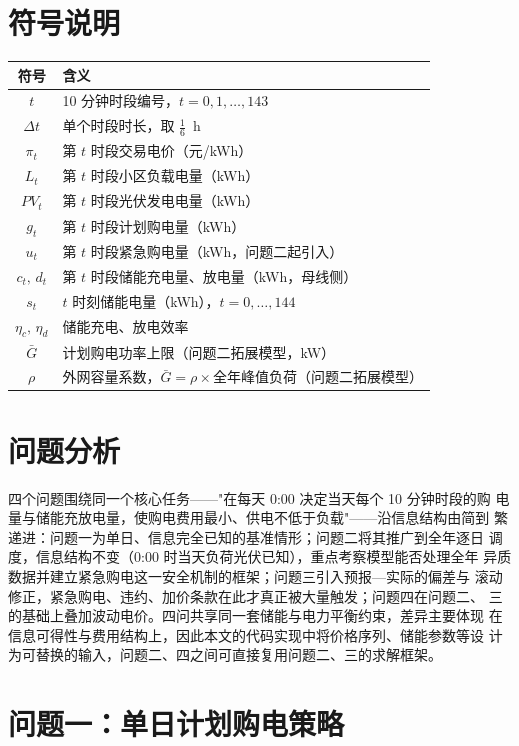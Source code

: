 \documentclass[withoutpreface,bwprint]{cumcmthesis}
\begin{document}
\section{符号说明}
\begin{center}
\begin{tabular}{cl}
\toprule[1.5pt]
符号 & 含义 \\
\midrule[1pt]
$t$ & 10 分钟时段编号，$t=0,1,\dots,143$ \\
$\Delta t$ & 单个时段时长，取 $\frac16$~h \\
$\pi_t$ & 第 $t$ 时段交易电价（元/kWh） \\
$L_t$ & 第 $t$ 时段小区负载电量（kWh） \\
$PV_t$ & 第 $t$ 时段光伏发电电量（kWh） \\
$g_t$ & 第 $t$ 时段计划购电量（kWh） \\
$u_t$ & 第 $t$ 时段紧急购电量（kWh，问题二起引入） \\
$c_t,\,d_t$ & 第 $t$ 时段储能充电量、放电量（kWh，母线侧） \\
$s_t$ & $t$ 时刻储能电量（kWh），$t=0,\dots,144$ \\
$\eta_c,\,\eta_d$ & 储能充电、放电效率 \\
$\bar G$ & 计划购电功率上限（问题二拓展模型，kW） \\
$\rho$ & 外网容量系数，$\bar G=\rho\times$全年峰值负荷（问题二拓展模型） \\
\bottomrule[1.5pt]
\end{tabular}
\end{center}

\section{问题分析}
四个问题围绕同一个核心任务——"在每天 0:00 决定当天每个 10 分钟时段的购
电量与储能充放电量，使购电费用最小、供电不低于负载"——沿信息结构由简到
繁递进：问题一为单日、信息完全已知的基准情形；问题二将其推广到全年逐日
调度，信息结构不变（0:00 时当天负荷光伏已知），重点考察模型能否处理全年
异质数据并建立紧急购电这一安全机制的框架；问题三引入预报—实际的偏差与
滚动修正，紧急购电、违约、加价条款在此才真正被大量触发；问题四在问题二、
三的基础上叠加波动电价。四问共享同一套储能与电力平衡约束，差异主要体现
在信息可得性与费用结构上，因此本文的代码实现中将价格序列、储能参数等设
计为可替换的输入，问题二、四之间可直接复用问题二、三的求解框架。

\section{问题一：单日计划购电策略}
\end{document}
